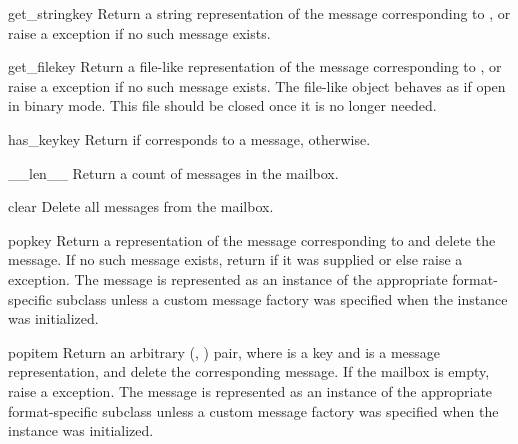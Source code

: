 \begin{methoddesc}{get_string}{key}
Return a string representation of the message corresponding to , or
raise a  exception if no such message exists.
\end{methoddesc}

\begin{methoddesc}{get_file}{key}
Return a file-like representation of the message corresponding to ,
or raise a  exception if no such message exists. The
file-like object behaves as if open in binary mode. This file should be closed
once it is no longer needed.

\end{methoddesc}

\begin{methoddesc}{has_key}{key}
Return  if  corresponds to a message, 
otherwise.
\end{methoddesc}

\begin{methoddesc}{__len__}{}
Return a count of messages in the mailbox.
\end{methoddesc}

\begin{methoddesc}{clear}{}
Delete all messages from the mailbox.
\end{methoddesc}

\begin{methoddesc}{pop}{key}
Return a representation of the message corresponding to  and delete
the message. If no such message exists, return  if it was supplied
or else raise a  exception. The message is represented as
an instance of the appropriate format-specific  subclass unless
a custom message factory was specified when the  instance was
initialized.
\end{methoddesc}

\begin{methoddesc}{popitem}{}
Return an arbitrary (, ) pair, where  is a key
and  is a message representation, and delete the corresponding
message. If the mailbox is empty, raise a  exception. The
message is represented as an instance of the appropriate format-specific
 subclass unless a custom message factory was specified when the
 instance was initialized.
\end{methoddesc}

